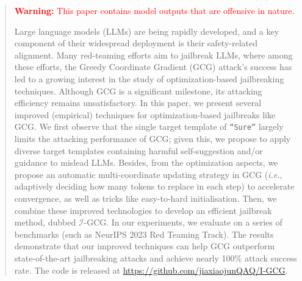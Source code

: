\begin{abstract}
\textcolor{red}{\textbf{Warning:} This paper contains model outputs that are offensive in nature.}


Large language models (LLMs) are being rapidly developed, and a key component of their widespread deployment is their safety-related alignment. Many red-teaming efforts aim to jailbreak LLMs, where among these efforts, the Greedy Coordinate Gradient (GCG) attack's success has led to a growing interest in the study of optimization-based jailbreaking techniques. Although GCG is a significant milestone, its attacking efficiency remains unsatisfactory. In this paper, we present several improved (empirical) techniques for optimization-based jailbreaks like GCG. We first observe that the single target template of \texttt{``Sure''} largely limits the attacking performance of GCG; given this, we propose to apply diverse target templates containing harmful self-suggestion and/or guidance to mislead LLMs. Besides, from the optimization aspects, we propose an automatic multi-coordinate updating strategy in GCG (\textit{i.e.}, adaptively deciding how many tokens to replace in each step) to accelerate convergence, as well as tricks like easy-to-hard initialisation. Then, we combine these improved technologies to develop an efficient jailbreak method, dubbed $\mathcal{I}$-GCG. In our experiments, we evaluate on a series of benchmarks (such as NeurIPS 2023 Red Teaming Track). The results demonstrate that our improved techniques can help GCG outperform state-of-the-art jailbreaking attacks and achieve nearly 100\% attack success rate.
The code is released at \href{https://github.com/jiaxiaojunQAQ/I-GCG}{https://github.com/jiaxiaojunQAQ/I-GCG}.













\end{abstract}
